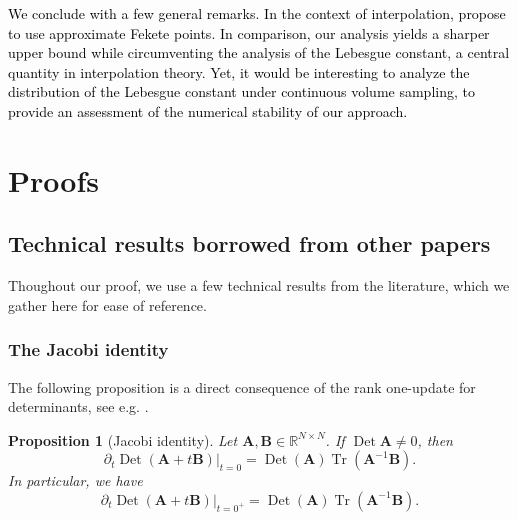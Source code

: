 \documentclass[twoside,11pt]{book}
\newcommand{\rev}[1]{\textcolor{black}{#1}}
\newtheorem{proposition}{Proposition}
\numberwithin{theorem}{chapter}
\numberwithin{definition}{chapter}
\numberwithin{proposition}{chapter}
\numberwithin{corollary}{chapter}
\numberwithin{example}{chapter}
\numberwithin{lemma}{chapter}
\numberwithin{assumption}{chapter}
\numberwithin{equation}{chapter}
\numberwithin{figure}{chapter}
\DeclareMathOperator{\Tr}{Tr}
\DeclareMathOperator{\Det}{Det}
\begin{document}
\rev{We conclude with a few general remarks.}
\rev{
In the context of interpolation, \parencite{KaSaTa19} propose to use approximate Fekete points. In comparison, our analysis yields a sharper upper bound while circumventing the analysis of the Lebesgue constant, a central quantity in interpolation theory. Yet, it would be interesting to analyze the distribution of the Lebesgue constant under continuous volume sampling, to provide an assessment of the numerical stability of our approach. }



\section{Proofs}

\subsection{Technical results borrowed from other papers}
Thoughout our proof, we use a few technical results from the literature, which we gather here for ease of reference.
\subsubsection{The Jacobi identity}
The following proposition is a direct consequence of the rank one-update for determinants, see e.g. \citep[Theorem 3.11]{MaSpSr15}.
\begin{proposition}[Jacobi identity]\label{CVS_thm:jacobi_identity}
Let $\bm{A}, \bm{B} \in \mathbb{R}^{N \times N}$. If $\Det\bm{A}\neq 0$, then
\begin{equation}
\partial_{t} \Det (\bm{A}+t\bm{B})|_{t = 0} = \Det(\bm{A}) \Tr(\bm{A}^{-1}\bm{B}).
\end{equation}
In particular, we have
\begin{equation}
\partial_{t} \Det (\bm{A}+t\bm{B})|_{t = 0^{+}} = \Det(\bm{A}) \Tr(\bm{A}^{-1}\bm{B}).
\end{equation}
\end{proposition}
\end{document}
